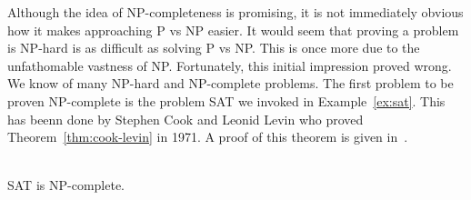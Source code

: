Although the idea of \textsf{NP}-completeness is promising, it is not immediately obvious how it makes approaching \textsf{P} vs \textsf{NP} easier. It would seem that proving a problem is \textsf{NP}-hard is as difficult as solving \textsf{P} vs \textsf{NP}. This is once more due to the unfathomable vastness of \textsf{NP}. Fortunately, this initial impression proved wrong. We know of many \textsf{NP}-hard and \textsf{NP}-complete problems. The first problem to be proven \textsf{NP}-complete is the problem \textsf{SAT} we invoked in Example~\ref{ex:sat}. This has beenn done by Stephen Cook and Leonid Levin who proved Theorem~\ref{thm:cook-levin} in 1971. A proof of this theorem is given in~\cite{langages-formels}.

\begin{theorem}\ \\
    \label{thm:cook-levin}
    \textsf{SAT} is \textsf{NP}-complete.
\end{theorem}


